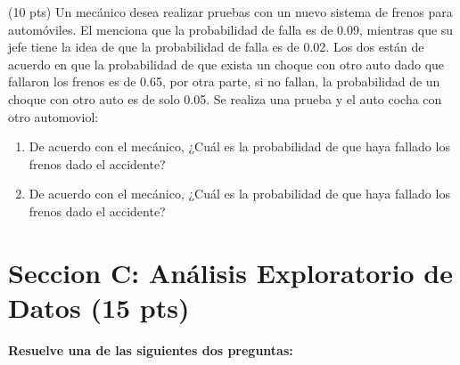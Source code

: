 \documentclass[addpoints]{exam}
\theoremstyle{mytheor}
\begin{document}
\begin{questions}
  \question  (10 pts) Un mecánico desea realizar pruebas con un nuevo sistema de frenos para automóviles. El menciona que la probabilidad de falla es de 0.09, mientras que su jefe  tiene la idea de que la probabilidad de falla es de 0.02. Los dos están de acuerdo en que la probabilidad de que exista un choque con otro auto dado que fallaron los frenos es de 0.65, por otra parte, si no fallan, la probabilidad de un choque con otro auto es de solo 0.05. Se realiza una prueba y el auto cocha con otro automoviol:
  \begin{enumerate}
  \item De acuerdo con el mecánico, ¿Cuál es la probabilidad de que haya fallado los frenos dado el accidente?
  \item De acuerdo con el mecánico, ¿Cuál es la probabilidad de que haya fallado los frenos dado el accidente?
  \end{enumerate}

\end{questions}


\section*{Seccion C: Análisis Exploratorio de Datos (15 pts)}

\textbf{Resuelve una de las siguientes dos preguntas:}
\end{document}
